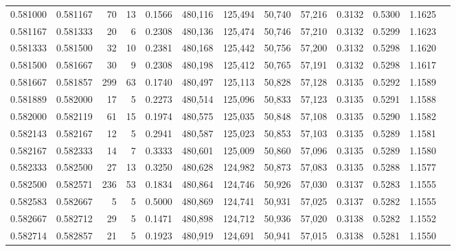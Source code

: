 \begin{tabular}{rrrrrrrrrrrrr}
0.581000 & 0.581167 &    70 &  13 &                                     0.1566 & 480,116 & 125,494 &  50,740 &  57,216 & 0.3132 & 0.5300 & 1.1625 \\
0.581167 & 0.581333 &    20 &   6 &                                     0.2308 & 480,136 & 125,474 &  50,746 &  57,210 & 0.3132 & 0.5299 & 1.1623 \\
0.581333 & 0.581500 &    32 &  10 &                                     0.2381 & 480,168 & 125,442 &  50,756 &  57,200 & 0.3132 & 0.5298 & 1.1620 \\
0.581500 & 0.581667 &    30 &   9 &                                     0.2308 & 480,198 & 125,412 &  50,765 &  57,191 & 0.3132 & 0.5298 & 1.1617 \\
0.581667 & 0.581857 &   299 &  63 &                                     0.1740 & 480,497 & 125,113 &  50,828 &  57,128 & 0.3135 & 0.5292 & 1.1589 \\
0.581889 & 0.582000 &    17 &   5 &                                     0.2273 & 480,514 & 125,096 &  50,833 &  57,123 & 0.3135 & 0.5291 & 1.1588 \\
0.582000 & 0.582119 &    61 &  15 &                                     0.1974 & 480,575 & 125,035 &  50,848 &  57,108 & 0.3135 & 0.5290 & 1.1582 \\
0.582143 & 0.582167 &    12 &   5 &                                     0.2941 & 480,587 & 125,023 &  50,853 &  57,103 & 0.3135 & 0.5289 & 1.1581 \\
0.582167 & 0.582333 &    14 &   7 &                                     0.3333 & 480,601 & 125,009 &  50,860 &  57,096 & 0.3135 & 0.5289 & 1.1580 \\
0.582333 & 0.582500 &    27 &  13 &                                     0.3250 & 480,628 & 124,982 &  50,873 &  57,083 & 0.3135 & 0.5288 & 1.1577 \\
0.582500 & 0.582571 &   236 &  53 &                                     0.1834 & 480,864 & 124,746 &  50,926 &  57,030 & 0.3137 & 0.5283 & 1.1555 \\
0.582583 & 0.582667 &     5 &   5 &                                     0.5000 & 480,869 & 124,741 &  50,931 &  57,025 & 0.3137 & 0.5282 & 1.1555 \\
0.582667 & 0.582712 &    29 &   5 &                                     0.1471 & 480,898 & 124,712 &  50,936 &  57,020 & 0.3138 & 0.5282 & 1.1552 \\
0.582714 & 0.582857 &    21 &   5 &                                     0.1923 & 480,919 & 124,691 &  50,941 &  57,015 & 0.3138 & 0.5281 & 1.1550 \\

\end{tabular}
